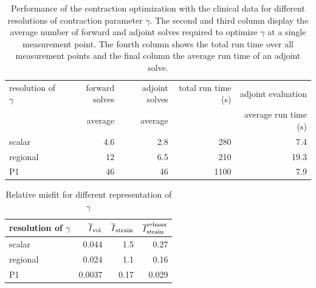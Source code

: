 \begin{table}
  \centering
\caption{Performance of the contraction optimization with the clinical data for different
resolutions of contraction parameter $\gamma$.
The second and third column display the average number of forward and adjoint solves required to
optimize $\gamma$ at a single measurement point. The fourth column shows the total run time over all measurement points and
the final column the average run time of an adjoint solve. }
\begin{tabular}{lrrrr}
\hline
 resolution of $\gamma$ & forward solves &    adjoint solves &   total run time (s)  & adjoint evaluation \\
                       &  average        & average           &                       & average run time (s) \\
\hline
 scalar                &                   4.6  &                   2.8 &    280   & 7.4 \\ %
 regional              &                   12   &                   6.5 &    210   & 19.3 \\ %
 P1                    &                   46   &                   46  &    1100  & 7.9 \\ %
\hline
\end{tabular}
\label{paper1:tab:patient_opt_details}
\end{table}



\begin{table}
\caption{Relative misfit for different representation of $\gamma$}
\begin{tabular}{lrrr}
\hline
 resolution of $\gamma$ &   $\overline{I}_{\text{vol}}$ &   $\overline{I}_{\text{strain}}$  &    $\overline{I}^{\text{relmax}}_{\text{strain}}$ \\
\hline
 scalar           &                          0.044  &                                              1.5  &                                             0.27  \\
 regional         &                          0.024  &                                              1.1  &                                             0.16  \\
 P1               &                          0.0037 &                                              0.17 &                                             0.029 \\
\hline
\end{tabular}
\label{paper1:tab:gamma_space_opt_misfit}
\end{table}



